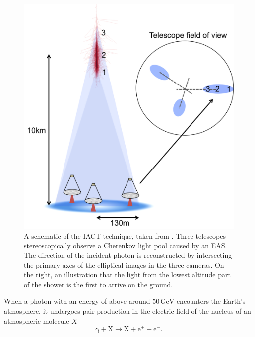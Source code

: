 \begin{figure}[ht] 
        \centering \includegraphics[width=0.7\columnwidth]{figures/schematic.png}

        \caption{
                \label{fig:schem} %
                A schematic of the IACT technique, taken from \cite{jamieiact}. Three telescopes stereoscopically observe a
                Cherenkov light pool caused by an EAS. The direction of the incident photon is reconstructed by intersecting the primary axes of 				 the elliptical images in the three cameras. On the right, an illustration that the light from the lowest altitude part of the shower is the first to arrive on the ground.
        }
\end{figure}
When a photon with an energy of above around $\mathrm{50\,GeV}$ encounters the Earth's atmosphere, it undergoes pair production in the electric field of the nucleus of an atmospheric molecule $X$
\begin{equation}
\mathrm{\gamma}+\mathrm{X} \rightarrow \mathrm{X}+\mathrm{e^+}+ \mathrm{e^-}.
\end{equation}

